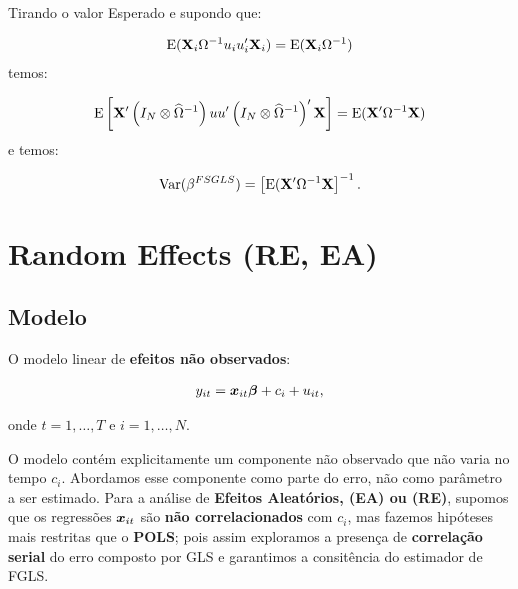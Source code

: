 \documentclass[11pt, oneside, a4paper, article]{article}
\numberwithin{equation}{section}
\begin{document}
\begin{description}
\begin{description}
Tirando o valor Esperado e supondo que:

\vspace{-1.5 em}
\begin{align*}
\text{E}(\mathbf{X}_{i} \Omega^{-1} u_{i} u_{i}' \mathbf{X}_{i}) = \text{E}(\mathbf{X}_{i} \Omega^{-1})
\end{align*}
temos:

\vspace{-1.5 em}
\begin{align*}
\text{E}\left[ \mathbf{X}' \left( I_{N} \otimes \widehat{\Omega}^{-1} \right)
	u u'
\left( I_{N} \otimes \widehat{\Omega}^{-1} \right)' \mathbf{X} \right]
=
\text{E}(\mathbf{X}' \Omega^{-1} \mathbf{X})
\end{align*}
e temos:

\vspace{-1.5 em}
\begin{align*}
	\text{Var}(\beta^{FSGLS}) = \left[ \text{E}(\mathbf{X}' \Omega^{-1} \mathbf{X} \right]^{-1}.
\end{align*}

\clearpage
\section{Random Effects (RE, EA)}


\subsection*{Modelo}

O modelo linear de \textbf{efeitos não observados}:

\vspace{-1 em}
\begin{align} \label{mod1:EA}
	y_{it} = \boldsymbol{x}_{it} \boldsymbol{\beta} + c_{i} + u_{it},
\end{align}

\noindent
onde
$t = 1, \dots, T$ e $i = 1, \dots, N$.

O modelo contém explicitamente um componente não observado que não varia no tempo $c_{i}$.
Abordamos esse componente como parte do erro, não como parâmetro a ser estimado.
Para a análise de \textbf{Efeitos Aleatórios, (EA) ou (RE)}, supomos que os regressões $\boldsymbol{x}_{it}$ são \textbf{não correlacionados} com $c_{i}$, mas fazemos hipóteses mais restritas que o \textbf{POLS}; pois assim exploramos a presença de \textbf{correlação serial} do erro composto por GLS e garantimos a consitência do estimador de FGLS.


\end{description}
\end{description}
\end{document}
